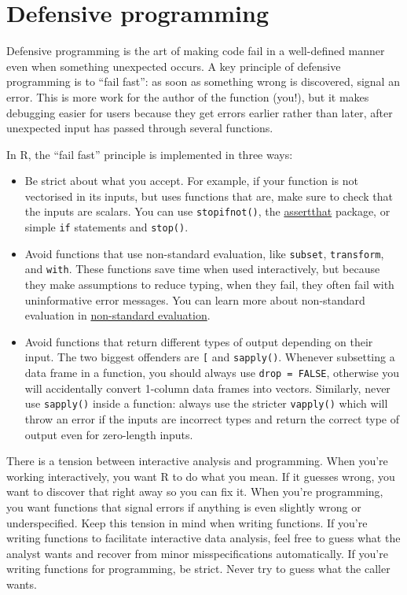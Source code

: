 \hypertarget{defensive-programming}{%
\section{Defensive programming}\label{defensive-programming}}

Defensive programming is the art of making code fail in a well-defined
manner even when something unexpected occurs. A key principle of
defensive programming is to ``fail fast'': as soon as something wrong is
discovered, signal an error. This is more work for the author of the
function (you!), but it makes debugging easier for users because they
get errors earlier rather than later, after unexpected input has passed
through several functions. 

In R, the ``fail fast'' principle is implemented in three ways:

\begin{itemize}
\item
  Be strict about what you accept. For example, if your function is not
  vectorised in its inputs, but uses functions that are, make sure to
  check that the inputs are scalars. You can use \texttt{stopifnot()},
  the \href{https://github.com/hadley/assertthat}{assertthat} package,
  or simple \texttt{if} statements and \texttt{stop()}.
\item
  Avoid functions that use non-standard evaluation, like
  \texttt{subset}, \texttt{transform}, and \texttt{with}. These
  functions save time when used interactively, but because they make
  assumptions to reduce typing, when they fail, they often fail with
  uninformative error messages. You can learn more about non-standard
  evaluation in \protect\hyperlink{nse}{non-standard evaluation}.
\item
  Avoid functions that return different types of output depending on
  their input. The two biggest offenders are \texttt{{[}} and
  \texttt{sapply()}. Whenever subsetting a data frame in a function, you
  should always use \texttt{drop\ =\ FALSE}, otherwise you will
  accidentally convert 1-column data frames into vectors. Similarly,
  never use \texttt{sapply()} inside a function: always use the stricter
  \texttt{vapply()} which will throw an error if the inputs are
  incorrect types and return the correct type of output even for
  zero-length inputs.
\end{itemize}

There is a tension between interactive analysis and programming. When
you're working interactively, you want R to do what you mean. If it
guesses wrong, you want to discover that right away so you can fix it.
When you're programming, you want functions that signal errors if
anything is even slightly wrong or underspecified. Keep this tension in
mind when writing functions. If you're writing functions to facilitate
interactive data analysis, feel free to guess what the analyst wants and
recover from minor misspecifications automatically. If you're writing
functions for programming, be strict. Never try to guess what the caller
wants.

